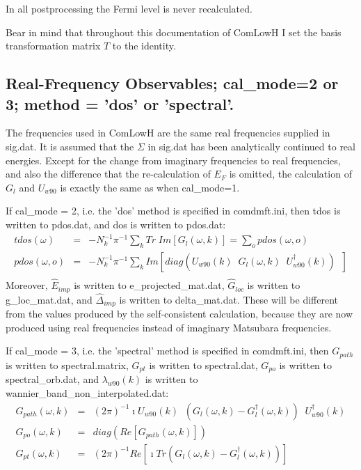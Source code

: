 \documentclass[aps,prb,singlecolumn,preprintnumbers,amsmath,amssymb]{revtex4}
\begin{document}
In all postprocessing the Fermi level is never recalculated.

Bear in mind that throughout this documentation of ComLowH I set the basis transformation matrix $T$ to the identity.


\subsection{Real-Frequency Observables; cal\_mode=2 or 3; method = 'dos' or 'spectral'.}

The frequencies used in ComLowH are the same real frequencies supplied in sig.dat.  It is assumed that the $\Sigma$ in sig.dat has been analytically continued to real energies. Except for the change from imaginary frequencies to real frequencies, and also the difference that the re-calculation of $E_F$ is omitted, the calculation of $G_l$ and $U_{w90}$ is exactly the same as when cal\_mode=1.

If cal\_mode = 2, i.e. the 'dos' method is specified in comdmft.ini, then tdos is written to pdos.dat,  and dos is written to pdos.dat:
\begin{eqnarray}
tdos(\omega) &=& -N_k^{-1} \pi^{-1} \sum_k  Tr\; Im[G_{l}(\omega, k)]= \sum_o pdos(\omega,o) \\
pdos(\omega,o) &=& -N_k^{-1} \pi^{-1} \sum_k Im[ diag( U_{w90}(k)  \;\;G_{l}(\omega, k)   \;\; U_{w90}^\dagger(k)) \;\; ]  \\
\end{eqnarray}
Moreover,  $\hat{E}_{imp}$ is written to e\_projected\_mat.dat, $\hat{G}_{loc}$ is written to g\_loc\_mat.dat, and  $\hat{\Delta}_{imp}$  is written to delta\_mat.dat.  These will be different from the values produced by the self-consistent calculation, because they are now produced using real frequencies instead of imaginary Matsubara frequencies.


If cal\_mode = 3, i.e. the 'spectral' method is specified in comdmft.ini, then $G_{path}$ is written to spectral.matrix,  $G_{pt}$ is written to spectral.dat, $G_{po}$ is written to spectral\_orb.dat, and $\lambda_{w90}(k)$ is written to wannier\_band\_non\_interpolated.dat:
\begin{eqnarray}
G_{path}(\omega,k) &=&   (2\pi)^{-1} \imath U_{w90}(k) \;\;  (G_{l}(\omega, k) - G_{l}^\dagger(\omega, k) )  \;\; U_{w90}^\dagger(k)  \\
G_{po}(\omega,k) &=& diag(Re[G_{path}(\omega,k)])   \\
G_{pt}(\omega,k) &=&  (2\pi)^{-1} Re[ \imath Tr(G_{l}(\omega, k)  - G_{l}^\dagger(\omega, k)) ]
\end{eqnarray}
\end{document}
